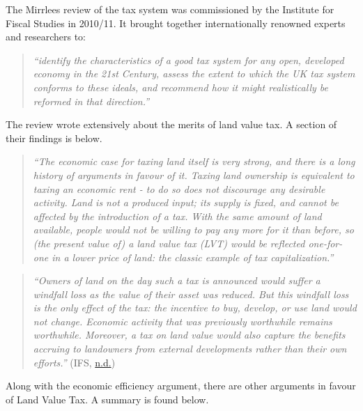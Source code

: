 \documentclass[]{tufte-handout}
\begin{document}
The Mirrlees review of the tax system was commissioned by the Institute
for Fiscal Studies in 2010/11. It brought together internationally
renowned experts and researchers to:

\begin{quote}
\emph{``identify the characteristics of a good tax system for any open,
developed economy in the 21st Century, assess the extent to which the UK
tax system conforms to these ideals, and recommend how it might
realistically be reformed in that direction.''}
\end{quote}

The review wrote extensively about the merits of land value tax. A
section of their findings is below.

\begin{quote}
\emph{``The economic case for taxing land itself is very strong, and
there is a long history of arguments in favour of it. Taxing land
ownership is equivalent to taxing an economic rent - to do so does not
discourage any desirable activity. Land is not a produced input; its
supply is fixed, and cannot be affected by the introduction of a tax.
With the same amount of land available, people would not be willing to
pay any more for it than before, so (the present value of) a land value
tax (LVT) would be reflected one-for-one in a lower price of land: the
classic example of tax capitalization.''}
\end{quote}

\begin{quote}
\emph{``Owners of land on the day such a tax is announced would suffer a
windfall loss as the value of their asset was reduced. But this windfall
loss is the only effect of the tax: the incentive to buy, develop, or
use land would not change. Economic activity that was previously
worthwhile remains worthwhile. Moreover, a tax on land value would also
capture the benefits accruing to landowners from external developments
rather than their own efforts.''} (IFS,
\protect\hyperlink{ref-IFS}{n.d.})
\end{quote}

Along with the economic efficiency argument, there are other arguments
in favour of Land Value Tax. A summary is found below.
\end{document}
